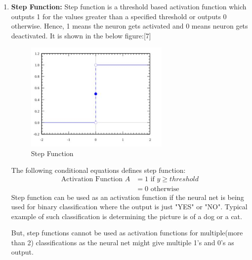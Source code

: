 \documentclass{IEEEtran}
\begin{document}
\begin{enumerate}
\item \textbf{Step Function:} Step function is a threshold based activation function which outputs 1 for the values greater than a specified threshold or outputs 0 otherwise. Hence, 1 means the neuron gets activated and 0 means neuron gets deactivated. It is shown in the below figure:[7]
\begin{figure}[h]
    \centering
    \captionsetup{justification=centering}
    \includegraphics[width=7cm]{step}
    \caption{Step Function}
    \label{fig: Step Function}
\end{figure}
The following conditional equations defines step function:
\begin{equation*}
\begin{aligned}
\text{Activation Function  } A &= 1 \text{    if    } y \geq threshold \\
						&= 0 \text{    otherwise}
\end{aligned}
\end{equation*}
Step function can be used as an activation function if the neural net is being used for binary classification where the output is just "YES" or "NO". Typical example of such classification is determining the picture is of a dog or a cat. 

But, step functions cannot be used as activation functions for multiple(more than 2) classifications as the neural net might give multiple 1's and 0's as output.


\end{enumerate}
\end{document}
